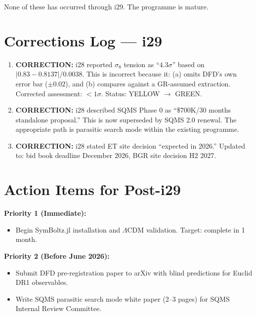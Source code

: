 \documentclass[11pt,a4paper]{article}
\begin{document}
None of these has occurred through i29. The programme is mature.

\section{Corrections Log --- i29}

\begin{enumerate}
\item \textbf{CORRECTION:} i28 reported $\sigma_8$ tension as ``$4.3\sigma$'' based on $|0.83 - 0.8137|/0.0038$. This is incorrect because it: (a) omits DFD's own error bar ($\pm 0.02$), and (b) compares against a GR-assumed extraction. Corrected assessment: $<1\sigma$. Status: YELLOW $\to$ GREEN.

\item \textbf{CORRECTION:} i28 described SQMS Phase 0 as ``\$700K/30 months standalone proposal.'' This is now superseded by SQMS 2.0 renewal. The appropriate path is parasitic search mode within the existing programme.

\item \textbf{CORRECTION:} i28 stated ET site decision ``expected in 2026.'' Updated to: bid book deadline December 2026, BGR site decision H2 2027.
\end{enumerate}

\section{Action Items for Post-i29}

\textbf{Priority 1 (Immediate):}
\begin{itemize}
\item Begin SymBoltz.jl installation and $\Lambda$CDM validation. Target: complete in 1 month.
\end{itemize}

\textbf{Priority 2 (Before June 2026):}
\begin{itemize}
\item Submit DFD pre-registration paper to arXiv with blind predictions for Euclid DR1 observables.
\item Write SQMS parasitic search mode white paper (2--3 pages) for SQMS Internal Review Committee.
\end{itemize}
\end{document}
